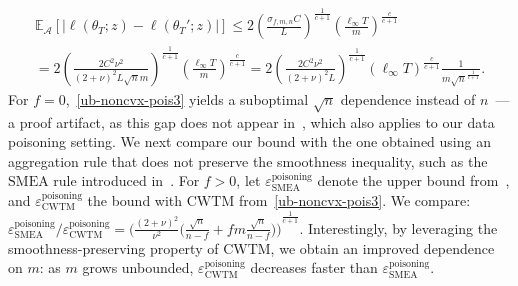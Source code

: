 \documentclass[twoside,11pt]{article}
\newcommand\mc{\mathcal}
\newcommand\mb{\mathbb}
\begin{document}
    \begin{multline*}
        \mb{E}_{\mc{A}}[ | \ell(\theta_T;z) - \ell(\theta_T';z) | ] 
        \leq 2 {\left( \frac{\sigma_{f, m, n} C}{L} \right)}^{\frac{1}{c+1}} {\left( \frac{\ell_\infty T}{m} \right)}^{\frac{c}{c+1}} \\
        = 2 {\left( \frac{2 C^2 \nu^2}{{(2+\nu)}^2 L \sqrt{n}m} \right)}^{\frac{1}{c+1}} {\left( \frac{\ell_\infty T}{m} \right)}^{\frac{c}{c+1}} 
        = 2 {\left( \frac{2 C^2 \nu^2}{{(2+\nu)}^2 L} \right)}^{\frac{1}{c+1}} {\left( \ell_\infty T \right)}^{\frac{c}{c+1}}  \frac{1}{m {\sqrt{n}}^{\frac{1}{c+1}} }.
        \tag*{\BlackBox}
    \end{multline*}
For $f=0$,~\eqref{ub-noncvx-pois3} yields a suboptimal $\sqrt{n}$ dependence instead of $n$~\citep{pmlr-v235-le-bars24a}—a proof artifact, as this gap does not appear in~\citet[Theorem E.3]{boudou2025generalization}, which also applies to our data poisoning setting.  
We next compare our bound with the one obtained using an aggregation rule that does not preserve the smoothness inequality, such as the $\mathrm{SMEA}$ rule introduced in~\citet{pmlr-v202-allouah23a}. 
For $f > 0$, let $\varepsilon^{\text{poisoning}}_{\mathrm{SMEA}}$ denote the upper bound from~\citet[Theorem E.3]{boudou2025generalization}, and $\varepsilon^{\text{poisoning}}_{\mathrm{CWTM}}$ the bound with $\mathrm{CWTM}$ from~\eqref{ub-noncvx-pois3}. 
We compare:
$
    \varepsilon^{\text{poisoning}}_{\mathrm{SMEA}} / \varepsilon^{\text{poisoning}}_{\mathrm{CWTM}}
    = {\big( \frac{{(2+\nu)}^2}{\nu^2} \big( \frac{\sqrt{n}}{n-f} + f m \frac{\sqrt{n}}{n-f} \big) \big)}^{\frac{1}{c+1}}.
$
Interestingly, by leveraging the smoothness-preserving property of $\mathrm{CWTM}$, we obtain an improved dependence on $m$: as $m$ grows unbounded, $\varepsilon^{\text{poisoning}}_{\mathrm{CWTM}}$ decreases faster than $\varepsilon^{\text{poisoning}}_{\mathrm{SMEA}}$.


\vskip 0.2in

\end{document}
